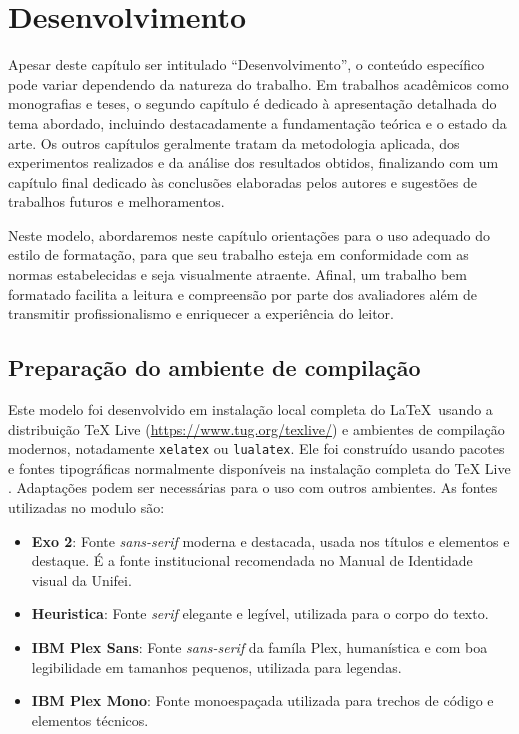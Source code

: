\chapter{Desenvolvimento}\label{cap:desenvolvimento}

Apesar deste capítulo ser intitulado ``Desenvolvimento'', o conteúdo específico pode variar dependendo
da natureza do trabalho. Em trabalhos acadêmicos como monografias e teses, o segundo capítulo é
dedicado à apresentação detalhada do tema abordado, incluindo destacadamente a fundamentação
teórica e o estado da arte. Os outros capítulos geralmente tratam da metodologia aplicada, dos
experimentos realizados e da análise dos resultados obtidos, finalizando com um capítulo final
dedicado às conclusões elaboradas pelos autores e sugestões de trabalhos futuros e melhoramentos.

Neste modelo, abordaremos neste capítulo orientações para o uso adequado do estilo de formatação,
para que seu trabalho esteja em conformidade com as normas estabelecidas e seja visualmente
atraente. Afinal, um trabalho bem formatado facilita a leitura e compreensão por parte dos
avaliadores além de transmitir profissionalismo e enriquecer a experiência do leitor.

\section{Preparação do ambiente de compilação}\label{sec:preparacao-ambiente}

Este modelo foi desenvolvido em instalação local completa do \LaTeX\, usando a distribuição TeX Live
(\url{https://www.tug.org/texlive/}) e ambientes de compilação modernos, notadamente
\texttt{xelatex} ou \texttt{lualatex}. Ele foi construído usando pacotes e fontes tipográficas
normalmente disponíveis na instalação completa do TeX Live . Adaptações podem ser necessárias para o
uso com outros ambientes. As fontes utilizadas no modulo são:
\begin{itemize}
      \item \textbf{Exo 2}: Fonte \emph{sans-serif} moderna e destacada, usada nos títulos e elementos e destaque. É a fonte institucional recomendada no Manual de Identidade visual da Unifei.
      \item \textbf{Heuristica}: Fonte \emph{serif} elegante e legível, utilizada para o corpo do texto.
      \item \textbf{IBM Plex Sans}: Fonte \emph{sans-serif} da famíla Plex, humanística e com boa legibilidade em tamanhos pequenos, utilizada para legendas.
      \item \textbf{IBM Plex Mono}: Fonte monoespaçada utilizada para trechos de código e elementos técnicos.
\end{itemize}

